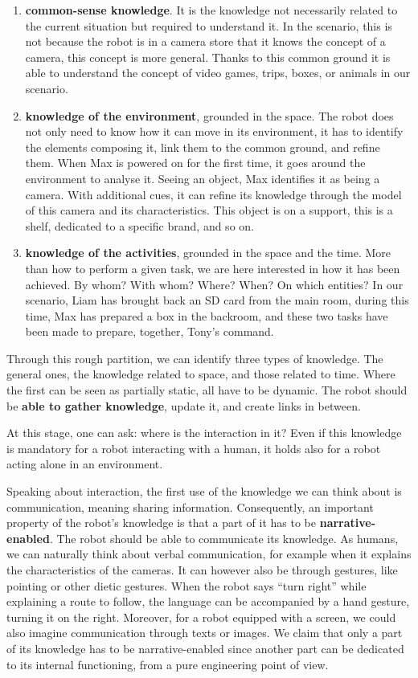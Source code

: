 \begin{enumerate}
  \item \textbf{common-sense knowledge}. It is the knowledge not necessarily related to the current situation but required to understand it. In the scenario, this is not because the robot is in a camera store that it knows the concept of a camera, this concept is more general. Thanks to this common ground it is able to understand the concept of video games, trips, boxes, or animals in our scenario.
  \item \textbf{knowledge of the environment}, grounded in the space. The robot does not only need to know how it can move in its environment, it has to identify the elements composing it, link them to the common ground, and refine them. When Max is powered on for the first time, it goes around the environment to analyse it. Seeing an object, Max identifies it as being a camera. With additional cues, it can refine its knowledge through the model of this camera and its characteristics. This object is on a support, this is a shelf, dedicated to a specific brand, and so on.
  \item \textbf{knowledge of the activities}, grounded in the space and the time. More than how to perform a given task, we are here interested in how it has been achieved. By whom? With whom? Where? When? On which entities? In our scenario, Liam has brought back an SD card from the main room, during this time, Max has prepared a box in the backroom, and these two tasks have been made to prepare, together, Tony's command.
\end{enumerate}

Through this rough partition, we can identify three types of knowledge. The general ones, the knowledge related to space, and those related to time. Where the first can be seen as partially static, all have to be dynamic. The robot should be \textbf{able to gather knowledge}, update it, and create links in between.

At this stage, one can ask: where is the interaction in it? Even if this knowledge is mandatory for a robot interacting with a human, it holds also for a robot acting alone in an environment.

Speaking about interaction, the first use of the knowledge we can think about is communication, meaning sharing information. Consequently, an important property of the robot's knowledge is that a part of it has to be \textbf{narrative-enabled}. The robot should be able to communicate its knowledge. As humans, we can naturally think about verbal communication, for example when it explains the characteristics of the cameras. It can however also be through gestures, like pointing or other dietic gestures. When the robot says ``turn right'' while explaining a route to follow, the language can be accompanied by a hand gesture, turning it on the right. Moreover, for a robot equipped with a screen, we could also imagine communication through texts or images. We claim that only a part of its knowledge has to be narrative-enabled since another part can be dedicated to its internal functioning, from a pure engineering point of view.

